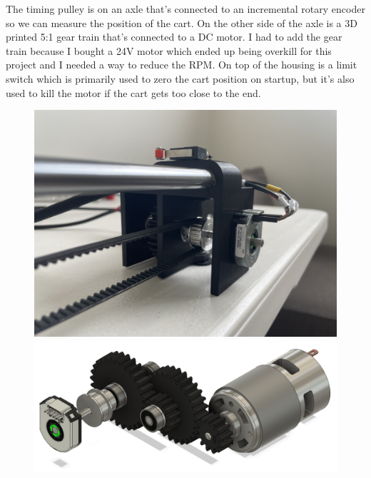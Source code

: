 \documentclass{article}
\begin{document}
The timing pulley is on an axle that's connected to an incremental rotary encoder so we can measure the position of the cart. On the other side of the axle is a 3D printed 5:1 gear train that's connected to a DC motor. I had to add the gear train because I bought a 24V motor which ended up being overkill for this project and I needed a way to reduce the RPM. On top of the housing is a limit switch which is primarily used to zero the cart position on startup, but it's also used to kill the motor if the cart gets too close to the end.

\begin{figure}[H]
  \begin{minipage}{0.45 \textwidth}
    \includegraphics[width=\textwidth]{construction_3}
  \end{minipage}
  \hfill
  \begin{minipage}{0.45 \textwidth}
    \includegraphics[width=\textwidth]{construction_4}
  \end{minipage}
\end{figure}
\end{document}
